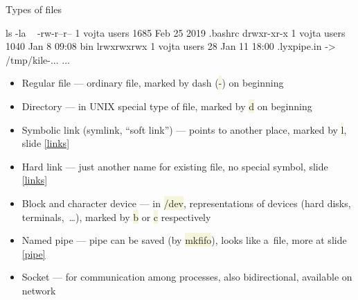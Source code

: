 \documentclass[compress, xelatex, 11pt, xcolor=svgnames, aspectratio=169,
	hyperref={
		bookmarks=true,
		unicode=true,
		colorlinks=true,
		pdftitle={Linux, command line and MetaCentrum},
		plainpages=false,
		pdfauthor={Vojtech Zeisek},
		pdfsubject={Course about use of Linux command line, writing shell scripts and using MetaCentrum of CESNET},
		pdfcreator={XeLaTeX},
		pdfkeywords={Linux, GNU, BASH, shell, command line, MetaCentrum},
		linkcolor=DarkRed, %
		anchorcolor=DarkBlue, %
		citecolor=Indigo, %
		filecolor=NavyBlue, %
		menucolor=DarkMagenta, %
		urlcolor=DarkBlue, %
		},
	url={hyphens, lowtilde} %
	]{beamer}
\renewcommand{\texttt}[1]{\colorbox{Beige}{{\ttfamily #1}}}
\begin{document}
\begin{frame}[fragile]{Types of files}
	\begin{bashcode}
    ls -la ~
    -rw-r--r-- 1 vojta users 1685 Feb 25  2019 .bashrc
    drwxr-xr-x 1 vojta users 1040 Jan  8 09:08 bin
    lrwxrwxrwx 1 vojta users   28 Jan 11 18:00 .lyxpipe.in -> /tmp/kile-...
    ...
	\end{bashcode}
	\vfill
	\begin{itemize}
		\item Regular file --- ordinary file, marked by dash (\texttt{-}) on beginning
		\item Directory --- in UNIX special type of file, marked by \texttt{d} on beginning
		\item Symbolic link (symlink, \enquote{soft link}) --- points to another place, marked by \texttt{l}, slide \ref{links}
		\item Hard link --- just another name for existing file, no special symbol, slide \ref{links}
		\item Block and character device --- in \texttt{/dev}, representations of devices (hard disks, terminals,~\ldots), marked by \texttt{b} or \texttt{c} respectively
		\item Named pipe --- pipe can be saved (by \texttt{mkfifo}), looks like a~file, more at slide \ref{pipe}
		\item Socket --- for communication among processes, also bidirectional, available on network
	\end{itemize}
\end{frame}
\end{document}
